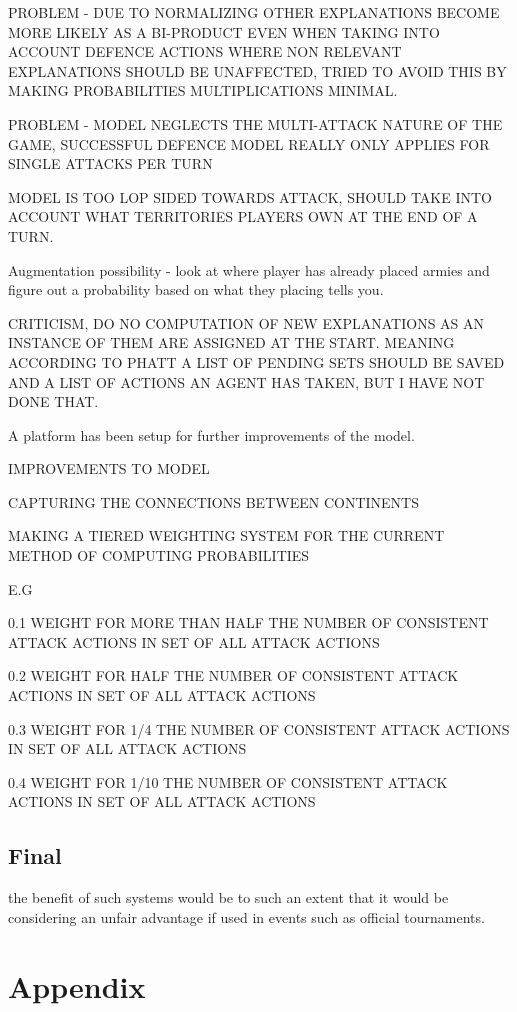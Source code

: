 \documentclass[parskip]{cs4rep}
\begin{document}
PROBLEM - DUE TO NORMALIZING OTHER EXPLANATIONS BECOME MORE LIKELY AS A BI-PRODUCT EVEN WHEN TAKING INTO ACCOUNT DEFENCE ACTIONS WHERE NON RELEVANT EXPLANATIONS SHOULD BE UNAFFECTED, TRIED TO AVOID THIS BY MAKING PROBABILITIES MULTIPLICATIONS MINIMAL.

PROBLEM - MODEL NEGLECTS THE MULTI-ATTACK NATURE OF THE GAME, SUCCESSFUL DEFENCE MODEL REALLY ONLY APPLIES FOR SINGLE ATTACKS PER TURN

MODEL IS TOO LOP SIDED TOWARDS ATTACK, SHOULD TAKE INTO ACCOUNT WHAT TERRITORIES PLAYERS OWN AT THE END OF A TURN.

Augmentation possibility - look at where player has already placed armies and figure out a probability based on what they placing tells you.

CRITICISM, DO NO COMPUTATION OF NEW EXPLANATIONS AS AN INSTANCE OF THEM ARE ASSIGNED AT THE START. MEANING ACCORDING TO PHATT A LIST OF PENDING SETS SHOULD BE SAVED AND A LIST OF ACTIONS AN AGENT HAS TAKEN, BUT I HAVE NOT DONE THAT.

A platform has been setup for further improvements of the model.

IMPROVEMENTS TO MODEL

CAPTURING THE CONNECTIONS BETWEEN CONTINENTS

MAKING A TIERED WEIGHTING SYSTEM FOR THE CURRENT METHOD OF COMPUTING PROBABILITIES

E.G 

0.1 WEIGHT FOR MORE THAN HALF THE NUMBER OF CONSISTENT ATTACK ACTIONS IN SET OF ALL ATTACK ACTIONS

0.2 WEIGHT FOR HALF THE NUMBER OF CONSISTENT ATTACK ACTIONS IN SET OF ALL ATTACK ACTIONS

0.3 WEIGHT FOR 1/4 THE NUMBER OF CONSISTENT ATTACK ACTIONS IN SET OF ALL ATTACK ACTIONS

0.4 WEIGHT FOR 1/10 THE NUMBER OF CONSISTENT ATTACK ACTIONS IN SET OF ALL ATTACK ACTIONS

\section{Final}

the benefit of such systems would be to such an extent that it would be considering an unfair advantage if used in events such as official tournaments.

\chapter{Appendix}
\end{document}
